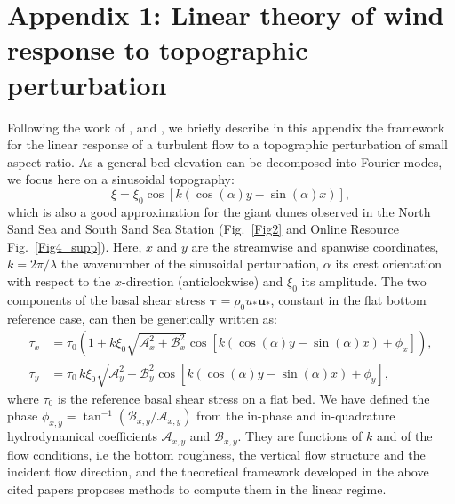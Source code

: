 \section*{Appendix 1: Linear theory of wind response to topographic perturbation}
\label{turbulent_wind_model}

Following the work of \citet{Fourriere2010}, \citet{Andreotti2012} and \citet{Andreotti2009}, we briefly describe in this appendix the framework for the linear response of a turbulent flow to a topographic perturbation of small aspect ratio. As a general bed elevation can be decomposed into Fourier modes, we focus here on a sinusoidal topography:
%
\begin{equation}
\xi = \xi_{0}\cos\left[k\left(\cos(\alpha)y - \sin(\alpha)x\right)\right],
\end{equation}
%
which is also a good approximation for the giant dunes observed in the North Sand Sea and South Sand Sea Station (Fig.~\ref{Fig2} and Online Resource Fig.~\ref{Fig4_supp}). Here, $x$ and $y$ are the streamwise and spanwise coordinates, $k=2\pi/\lambda$ the wavenumber of the sinusoidal perturbation, $\alpha$ its crest orientation with respect to the $x$-direction (anticlockwise) and $\xi_{0}$ its amplitude. The two components of the basal shear stress $\boldsymbol{\tau} = \rho_{0} u_{*}\boldsymbol{u}_{*}$, constant in the flat bottom reference case, can then be generically written as:
%
\begin{align}
\tau_{x} & = \tau_{0}\left(1 + k\xi_{0}\sqrt{\mathcal{A}_{x}^{2} + \mathcal{B}_{x}^{2}}\cos\left[k\left(\cos(\alpha)y - \sin(\alpha)x\right) + \phi_{x}\right]\right), \\
\tau_{y} & = \tau_{0} \, k\xi_{0}\sqrt{\mathcal{A}_{y}^{2} + \mathcal{B}_{y}^{2}}\cos\left[k\left(\cos(\alpha)y - \sin(\alpha)x\right) + \phi_{y}\right],
\end{align}
%
where $\tau_{0}$ is the reference basal shear stress on a flat bed. We have defined the phase $\phi_{x, y} = \tan^{-1}\left(\mathcal{B}_{x, y}/\mathcal{A}_{x, y}\right)$ from the in-phase and in-quadrature hydrodynamical coefficients $\mathcal{A}_{x, y}$ and $\mathcal{B}_{x, y}$. They are functions of $k$ and of the flow conditions, i.e the bottom roughness, the vertical flow structure and the incident flow direction, and the theoretical framework developed in the above cited papers proposes methods to compute them in the linear regime.

